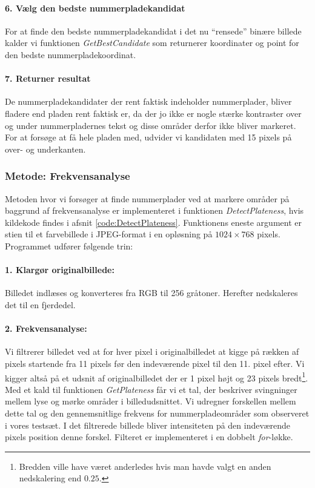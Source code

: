 \paragraph{6. Vælg den bedste nummerpladekandidat}
For at finde den bedste nummerpladekandidat i det nu ``rensede'' binære billede kalder vi funktionen \textit{GetBestCandidate} som returnerer koordinater og point for den bedste nummerpladekoordinat.

\paragraph{7. Returner resultat}
De nummerpladekandidater der rent faktisk indeholder nummerplader, bliver fladere end pladen rent faktisk er, da der jo ikke er nogle stærke kontraster over og under nummerpladernes tekst og disse områder derfor ikke bliver markeret. For at forsøge at få hele pladen med, udvider vi kandidaten med 15 pixels på over- og underkanten. 

\subsubsection{Metode: Frekvensanalyse}
Metoden hvor vi forsøger at finde nummerplader ved at markere områder på baggrund af frekvensanalyse er implementeret i funktionen \textit{DetectPlateness}, hvis kildekode findes i afsnit \vref{code:DetectPlateness}. Funktionens eneste argument er stien til et farvebillede i JPEG-format i en opløsning på $1024 \times 768$ pixels. Programmet udfører følgende trin:

\paragraph{1. Klargør originalbillede:}
Billedet indlæses og konverteres fra RGB til 256 gråtoner. Herefter nedskaleres det til en fjerdedel.

\paragraph{2. Frekvensanalyse:}
Vi filtrerer billedet ved at for hver pixel i originalbilledet at kigge på rækken af pixels startende fra 11 pixels før den indeværende pixel til den 11. pixel efter. Vi kigger altså på et udsnit af originalbilledet der er 1 pixel højt og 23 pixels bredt\footnote{Bredden ville have været anderledes hvis man havde valgt en anden nedskalering end $0.25$.}. Med et kald til funktionen \textit{GetPlateness} får vi et tal, der beskriver svingninger mellem lyse og mørke områder i billedudsnittet. Vi udregner forskellen mellem dette tal og den gennemsnitlige frekvens for nummerpladeområder som observeret i vores testsæt. I det filtrerede billede bliver intensiteten på den indeværende pixels position denne forskel. Filteret er implementeret i en dobbelt \textit{for}-løkke.

